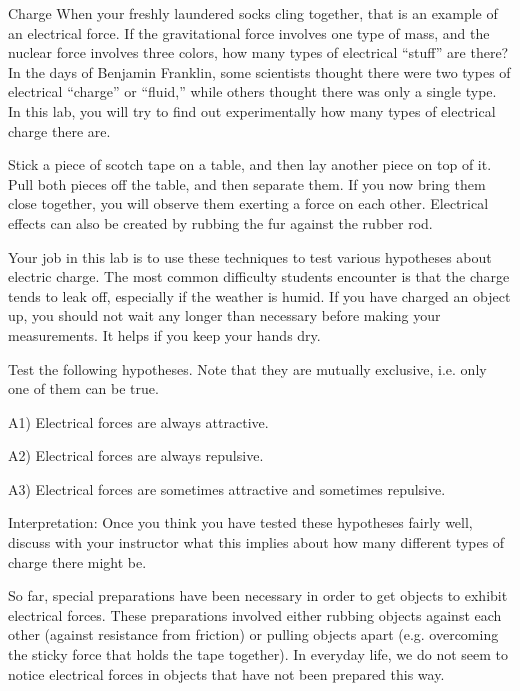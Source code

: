 \begin{lab}{Charge}
When your freshly laundered socks cling together, that is an
example of an electrical force. If the gravitational force
involves one type of mass, and the nuclear force involves
three colors, how many types of electrical ``stuff'' are
there? In the days of Benjamin Franklin, some scientists
thought there were two types of electrical ``charge'' or
``fluid,'' while others thought there was only a single
type. In this lab, you will try to find out experimentally
how many types of electrical charge there are.

\labobservations

Stick a piece of scotch tape on a table, and then lay
another piece on top of it. Pull both pieces off the table,
and then separate them. If you now bring them close
together, you will observe them exerting a force on each
other. Electrical effects can also be created by rubbing the
fur against the rubber rod.

Your job in this lab is to use these techniques to test
various hypotheses about electric charge. The most common
difficulty students encounter is that the charge tends to
leak off, especially if the weather is humid. If you have
charged an object up, you should not wait any longer than
necessary before making your measurements. It helps if you
keep your hands dry.


Test the following hypotheses. Note that they are
mutually exclusive, i.e. only one of them can be true.

A1) Electrical forces are always attractive.

A2) Electrical forces are always repulsive.

A3) Electrical forces are sometimes attractive and
sometimes repulsive.

Interpretation: Once you think you have tested these
hypotheses fairly well, discuss with your instructor what
this implies about how many different types of charge there might be.


So far, special preparations have been necessary in order to
get objects to exhibit electrical forces. These preparations
involved either rubbing objects against each other (against
resistance from friction) or pulling objects apart (e.g.
overcoming the sticky force that holds the tape together).
In everyday life, we do not seem to notice electrical forces
in objects that have not been prepared this way.


\end{lab}
